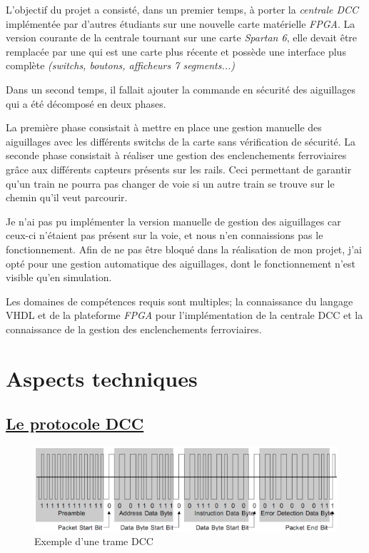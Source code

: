 L'objectif du projet a consisté, dans un premier temps, à porter la
\emph{centrale DCC} implément\'ee par d'autres \'etudiants sur une nouvelle
carte mat\'erielle \emph{FPGA}. La version courante de la centrale tournant sur
une carte \emph{Spartan 6}, elle devait être remplac\'ee par une \crt qui est
une carte plus r\'ecente et possède une interface plus complète
\emph{(switchs, boutons, afficheurs 7 segments...)}

Dans un second temps, il fallait ajouter la commande en
sécurité des aiguillages qui a été décomposé en deux phases.

La première phase consistait à mettre en place une gestion manuelle des aiguillages avec
les diff\'erents switchs de la carte sans v\'erification de
s\'ecurit\'e.
La seconde phase consistait à réaliser une gestion des
enclenchements ferroviaires grâce aux différents capteurs pr\'esents sur
les rails. Ceci permettant de garantir qu'un train ne pourra pas
changer de voie si un autre train se trouve sur le chemin
qu'il veut parcourir. 


Je n'ai pas pu implémenter la version manuelle de gestion des aiguillages  car ceux-ci
 n'étaient pas présent sur la voie, et nous n'en connaissions pas
le fonctionnement. Afin de ne pas être bloqué dans la réalisation de mon projet,
j'ai opté pour une gestion automatique des
aiguillages, dont le fonctionnement n'est visible qu'en simulation.


Les domaines de comp\'etences requis sont multiples; la connaissance
du langage VHDL et de la plateforme \emph{FPGA} pour l'impl\'ementation
de la centrale DCC et la connaissance de la gestion des enclenchements
ferroviaires.


\newpage
\section{Aspects techniques}
\label{sec:asp_tech}

\subsection{\underline{Le protocole DCC}}
\label{sec:dcc}


\begin{figure}[h]
\centering
\includegraphics[scale=0.75]{trame.png}
\caption{Exemple d'une trame DCC}
\label{fig1}
\end{figure}

